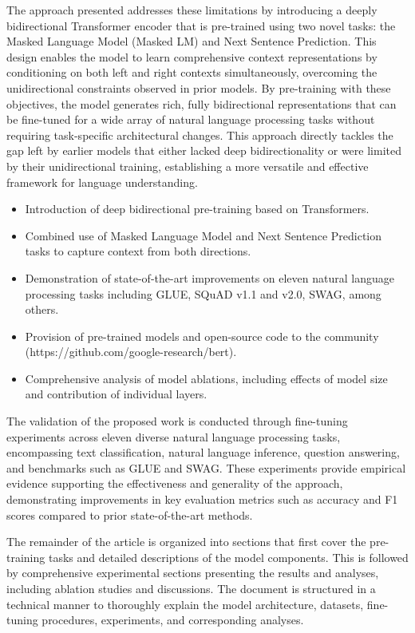 \documentclass[journal]{IEEEtran}
\begin{document}
The approach presented addresses these limitations by introducing a deeply bidirectional Transformer encoder that is pre-trained using two novel tasks: the Masked Language Model (Masked LM) and Next Sentence Prediction. This design enables the model to learn comprehensive context representations by conditioning on both left and right contexts simultaneously, overcoming the unidirectional constraints observed in prior models. By pre-training with these objectives, the model generates rich, fully bidirectional representations that can be fine-tuned for a wide array of natural language processing tasks without requiring task-specific architectural changes. This approach directly tackles the gap left by earlier models that either lacked deep bidirectionality or were limited by their unidirectional training, establishing a more versatile and effective framework for language understanding.

\begin{itemize}
  \item Introduction of deep bidirectional pre-training based on Transformers.
  \item Combined use of Masked Language Model and Next Sentence Prediction tasks to capture context from both directions.
  \item Demonstration of state-of-the-art improvements on eleven natural language processing tasks including GLUE, SQuAD v1.1 and v2.0, SWAG, among others.
  \item Provision of pre-trained models and open-source code to the community (https://github.com/google-research/bert).
  \item Comprehensive analysis of model ablations, including effects of model size and contribution of individual layers.
\end{itemize}

The validation of the proposed work is conducted through fine-tuning experiments across eleven diverse natural language processing tasks, encompassing text classification, natural language inference, question answering, and benchmarks such as GLUE and SWAG. These experiments provide empirical evidence supporting the effectiveness and generality of the approach, demonstrating improvements in key evaluation metrics such as accuracy and F1 scores compared to prior state-of-the-art methods.

The remainder of the article is organized into sections that first cover the pre-training tasks and detailed descriptions of the model components. This is followed by comprehensive experimental sections presenting the results and analyses, including ablation studies and discussions. The document is structured in a technical manner to thoroughly explain the model architecture, datasets, fine-tuning procedures, experiments, and corresponding analyses.
\end{document}
